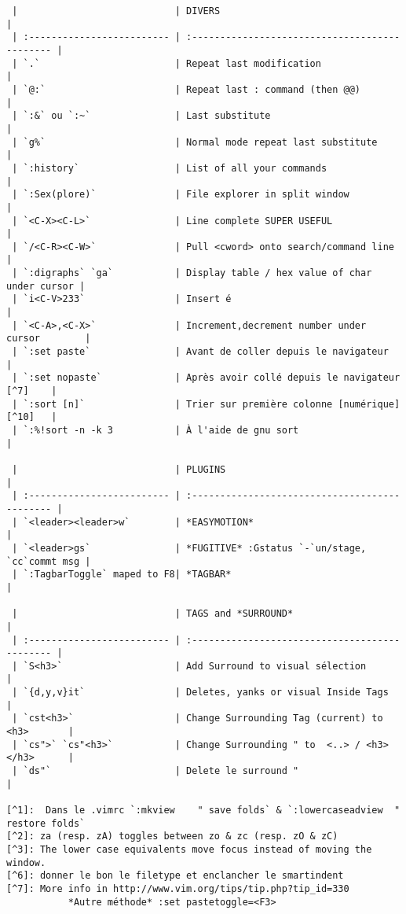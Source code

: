 \documentclass[10pt,landscape]{article}
\begin{document}
\begin{multicols}{2}
\begin{verbatim}
 |                            | DIVERS                                         |
 | :------------------------- | :--------------------------------------------- |
 | `.`                        | Repeat last modification                       |
 | `@:`                       | Repeat last : command (then @@)                |
 | `:&` ou `:~`               | Last substitute                                |
 | `g%`                       | Normal mode repeat last substitute             |
 | `:history`                 | List of all your commands                      |
 | `:Sex(plore)`              | File explorer in split window                  |
 | `<C-X><C-L>`               | Line complete SUPER USEFUL                     |
 | `/<C-R><C-W>`              | Pull <cword> onto search/command line          |
 | `:digraphs` `ga`           | Display table / hex value of char under cursor |
 | `i<C-V>233`                | Insert é                                       |
 | `<C-A>,<C-X>`              | Increment,decrement number under cursor        |
 | `:set paste`               | Avant de coller depuis le navigateur           |
 | `:set nopaste`             | Après avoir collé depuis le navigateur [^7]    |
 | `:sort [n]`                | Trier sur première colonne [numérique] [^10]   |
 | `:%!sort -n -k 3           | À l'aide de gnu sort                           |

 |                            | PLUGINS                                        |
 | :------------------------- | :--------------------------------------------- |
 | `<leader><leader>w`        | *EASYMOTION*                                   |
 | `<leader>gs`               | *FUGITIVE* :Gstatus `-`un/stage, `cc`commt msg |
 | `:TagbarToggle` maped to F8| *TAGBAR*                                       |

 |                            | TAGS and *SURROUND*                            |
 | :------------------------- | :--------------------------------------------- |
 | `S<h3>`                    | Add Surround to visual sélection               |
 | `{d,y,v}it`                | Deletes, yanks or visual Inside Tags           |
 | `cst<h3>`                  | Change Surrounding Tag (current) to <h3>       |
 | `cs">` `cs"<h3>`           | Change Surrounding " to  <..> / <h3></h3>      |
 | `ds"`                      | Delete le surround "                           |

[^1]:  Dans le .vimrc `:mkview    " save folds` & `:lowercaseadview  " restore folds`
[^2]: za (resp. zA) toggles between zo & zc (resp. zO & zC)
[^3]: The lower case equivalents move focus instead of moving the window.
[^6]: donner le bon le filetype et enclancher le smartindent
[^7]: More info in http://www.vim.org/tips/tip.php?tip_id=330 
           *Autre méthode* :set pastetoggle=<F3>

\end{verbatim}
\end{multicols}
\end{document}
